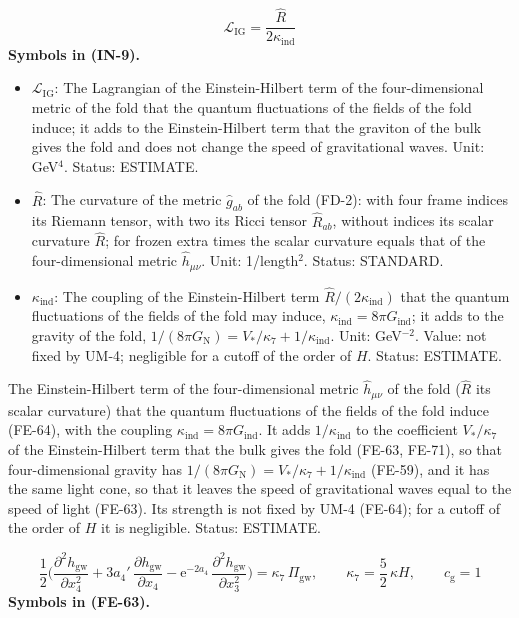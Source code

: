 \documentclass[
  10pt,
]{article}
\providecommand{\tightlist}{%
  \setlength{\itemsep}{0pt}\setlength{\parskip}{0pt}}
\begin{document}
\[
\mathcal{L}_{\mathrm{IG}} = \frac{\hat R}{2\kappa_{\mathrm{ind}}} \tag{IN-9}
\] \textbf{Symbols in (IN-9).}

\begin{itemize}
\tightlist
\item
  \(\mathcal{L}_{\mathrm{IG}}\): The Lagrangian of the Einstein-Hilbert
  term of the four-dimensional metric of the fold that the quantum
  fluctuations of the fields of the fold induce; it adds to the
  Einstein-Hilbert term that the graviton of the bulk gives the fold and
  does not change the speed of gravitational waves. Unit: GeV\(^4\).
  Status: ESTIMATE.
\item
  \(\hat R\): The curvature of the metric \(\hat g_{ab}\) of the fold
  (FD-2): with four frame indices its Riemann tensor, with two its Ricci
  tensor \(\hat R_{ab}\), without indices its scalar curvature
  \(\hat R\); for frozen extra times the scalar curvature equals that of
  the four-dimensional metric \(\hat h_{\mu\nu}\). Unit: 1/length\(^2\).
  Status: STANDARD.
\item
  \(\kappa_{\mathrm{ind}}\): The coupling of the Einstein-Hilbert term
  \(\hat R/(2\kappa_{\mathrm{ind}})\) that the quantum fluctuations of
  the fields of the fold may induce,
  \(\kappa_{\mathrm{ind}} = 8\pi G_{\mathrm{ind}}\); it adds to the
  gravity of the fold,
  \(1/(8\pi G_{\mathrm{N}}) = V_*/\kappa_7 + 1/\kappa_{\mathrm{ind}}\).
  Unit: GeV\(^{-2}\). Value: not fixed by UM-4; negligible for a cutoff
  of the order of \(H\). Status: ESTIMATE.
\end{itemize}

The Einstein-Hilbert term of the four-dimensional metric
\(\hat h_{\mu\nu}\) of the fold (\(\hat R\) its scalar curvature) that
the quantum fluctuations of the fields of the fold induce (FE-64), with
the coupling \(\kappa_{\mathrm{ind}} = 8\pi G_{\mathrm{ind}}\). It adds
\(1/\kappa_{\mathrm{ind}}\) to the coefficient \(V_*/\kappa_7\) of the
Einstein-Hilbert term that the bulk gives the fold (FE-63, FE-71), so
that four-dimensional gravity has
\(1/(8\pi G_{\mathrm{N}}) = V_*/\kappa_7 + 1/\kappa_{\mathrm{ind}}\)
(FE-59), and it has the same light cone, so that it leaves the speed of
gravitational waves equal to the speed of light (FE-63). Its strength is
not fixed by UM-4 (FE-64); for a cutoff of the order of \(H\) it is
negligible. Status: ESTIMATE.

\[
\frac{1}{2}\Big(\frac{\partial^2h_{\mathrm{gw}}}{\partial x_4^2} + 3a_4'\,\frac{\partial h_{\mathrm{gw}}}{\partial x_4}
 - \mathrm{e}^{-2a_4}\,\frac{\partial^2h_{\mathrm{gw}}}{\partial x_3^2}\Big) = \kappa_7\,\Pi_{\mathrm{gw}},\qquad
\kappa_7 = \frac52\,\kappa H,\qquad c_{\mathrm{g}} = 1 \tag{FE-63}
\] \textbf{Symbols in (FE-63).}
\end{document}

